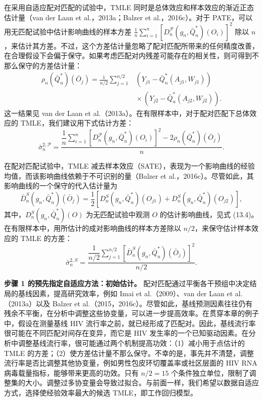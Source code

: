 在采用自适应配对匹配的试验中，TMLE 同时是总体效应和样本效应的渐近正态估计量（van der Laan et al.，2013a；Balzer et al.，2016c）。对于 PATE，可以用无匹配试验中估计影响曲线的样本方差
$\frac1n\sum_{i=1}^n[D_n^{\mathcal P}(g_n,\bar Q_n^*)(O_i)]^2$
除以 $n$，来估计其方差。不过，这个方差估计量忽略了配对匹配所带来的任何精度改善，在合理假设下会偏于保守。如果考虑匹配对内残差可能存在的相关性，则可得到不那么保守的方差估计量：
\begin{equation}
 \begin{aligned}
 \rho_n(\bar Q_n^*)(\bar O_j)
 =\frac1{n/2}\sum_{j=1}^{n/2}
  &(Y_{j1}-\bar Q_n^*(A_{j1},W_{j1}))\\
  &{}\times(Y_{j2}-\bar Q_n^*(A_{j2},W_{j2})).
 \end{aligned}
 \tag{13.7}
\end{equation}
这一结果见 van der Laan et al.（2013a）。在有限样本中，对于配对匹配下总体效应的 TMLE，我们建议用下式估计方差：
\[
 \bar\sigma_n^{2,\mathcal P}
 =\frac{\dfrac1n\displaystyle\sum_{i=1}^n
           [D_n^{\mathcal P}(g_n,\bar Q_n^*)(O_i)]^2
          -2\rho_n(\bar Q_n^*)(\bar O_j)}{n}.
\]

在配对匹配试验中，TMLE 减去样本效应（SATE），表现为一个影响曲线的经验均值，而该影响曲线依赖于不可识别的量（Balzer et al.，2016c）。尽管如此，其影响曲线的一个保守的代入估计量为
\[
 \bar D_n^S(g_n,\bar Q_n^*)(\bar O_j)
 =\frac12\left[D_n^S(g_n,\bar Q_n^*)(O_{j1})
              +D_n^S(g_n,\bar Q_n^*)(O_{j2})\right],
\]
其中，$D_n^S(g_n,\bar Q_n^*)(O)$ 为无匹配试验中观测 $O$ 的估计影响曲线，见式 (13.4)。在有限样本中，用所估计的成对影响曲线的样本方差除以 $n/2$，来保守估计样本效应的 TMLE 的方差：
\[
 \bar\sigma_n^{2,S}
 =\frac{\dfrac1{n/2}\displaystyle\sum_{j=1}^{n/2}
       [\bar D_n^S(g_n,\bar Q_n^*)(\bar O_j)]^2}{n/2}.
\]

\noindent\textbf{步骤 1 的预先指定自适应方法：初始估计。}
配对匹配通过平衡各干预组中决定结局的基线因素，提高研究效率，例如 Imai et al.（2009）、van der Laan et al.（2013a）以及 Balzer et al.（2015，2016c）。尽管如此，基线预测因素往往仍有残余不平衡，在分析中调整这些协变量，可以进一步提高效率。在贯穿本章的例子中，假设在测量基线 HIV 流行率之前，就已经形成了匹配对。因此，基线流行率很可能在不同匹配对间存在变异，而它是 HIV 发生率的一个已知驱动因素。在分析中调整基线流行率，很可能通过两个机制提高功效：（1）减小用于点估计的 TMLE 的方差；（2）使方差估计量不那么保守。不幸的是，事先并不清楚，调整流行率是否比调整其他协变量，例如男性包皮环切覆盖率或社区层面的 HIV RNA 病毒载量指标，能够带来更高的功效。只有 $n/2=15$ 个条件独立单位，限制了调整集的大小。调整过多协变量会导致过拟合。与前面一样，我们希望以数据自适应方式，选择使经验效率最大的候选 TMLE，即工作回归模型。

